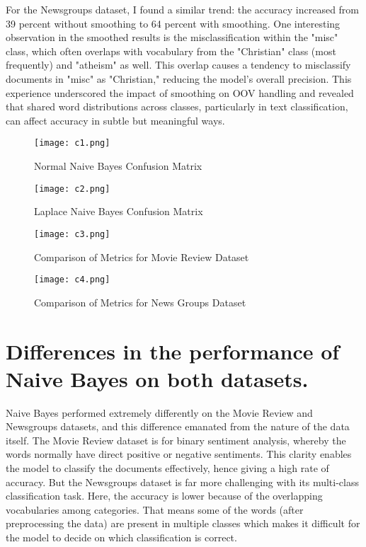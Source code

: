 \documentclass{article}
\begin{document}
For the Newsgroups dataset, I found a similar trend: the accuracy increased from 39 percent without smoothing to 64 percent with smoothing. One interesting observation in the smoothed results is the misclassification within the "misc" class, which often overlaps with vocabulary from the "Christian" class (most frequently) and "atheism" as well. This overlap causes a tendency to misclassify documents in "misc" as "Christian," reducing the model’s overall precision. This experience underscored the impact of smoothing on OOV handling and revealed that shared word distributions across classes, particularly in text classification, can affect accuracy in subtle but meaningful ways.

\begin{figure}[H]
    \centering
    \texttt{[image: c1.png]}
    \caption{Normal Naive Bayes Confusion Matrix}
    \label{fig:your_label}
\end{figure}

\begin{figure}[H]
    \centering
    \texttt{[image: c2.png]}
    \caption{Laplace Naive Bayes Confusion Matrix}
    \label{fig:your_label}
\end{figure}

\begin{figure}[H]
    \centering
    \texttt{[image: c3.png]}
    \caption{Comparison of Metrics for Movie Review Dataset}
    \label{fig:your_label}
\end{figure}

\begin{figure}[H]
    \centering
    \texttt{[image: c4.png]}
    \caption{Comparison of Metrics for News Groups Dataset}
    \label{fig:your_label}
\end{figure}

\section*{Differences in the performance of Naive Bayes on both datasets.}

Naive Bayes performed extremely differently on the Movie Review and Newsgroups datasets, and this difference emanated from the nature of the data itself. The Movie Review dataset is for binary sentiment analysis, whereby the words normally have direct positive or negative sentiments. This clarity enables the model to classify the documents effectively, hence giving a high rate of accuracy. But the Newsgroups dataset is far more challenging with its multi-class classification task. Here, the accuracy is lower because of the overlapping vocabularies among categories. That means some of the words (after preprocessing the data) are present in multiple classes which makes it difficult for the model to decide on which classification is correct. 
\end{document}
